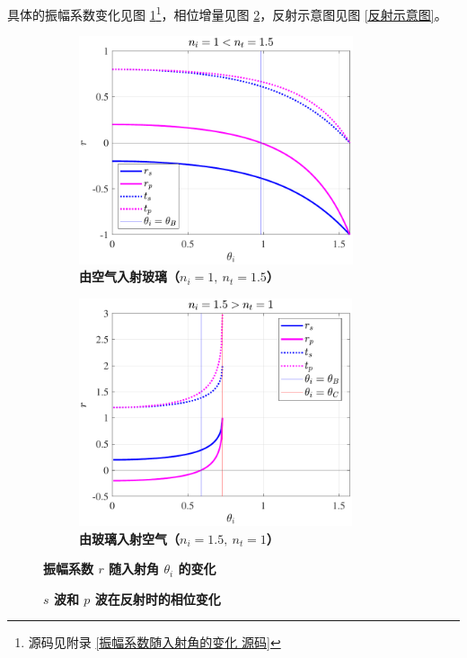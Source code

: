 \documentclass[UTF8]{report}
\theoremstyle{MyLineTheoremStyle} %
\theoremstyle{MyBlockTheoremStyle} %
\theoremstyle{MySubsubsectionStyle} %
\begin{document}
具体的振幅系数变化见图 \ref{振幅系数随入射角的变化}\footnote{源码见附录 \ref{振幅系数随入射角的变化 源码}}，相位增量见图 \ref{反射时 s 波和 p 波的相位变化}，反射示意图见图 \ref{反射示意图}。

\begin{figure}[H]\centering
\begin{subfigure}[t]{0.49\textwidth}\centering
    \includegraphics[height=190pt]{assets/1,2/2024-09-15_10-53-31.pdf}
    \caption{\bfseries 由空气入射玻璃（$n_i = 1,\ n_t = 1.5$） }
\end{subfigure}
\begin{subfigure}[t]{0.49\textwidth}\centering
    \includegraphics[height=190pt]{assets/1,2/2024-09-15_10-53-27.pdf}
    \caption{\bfseries 由玻璃入射空气（$n_i = 1.5,\ n_t = 1$） }
\end{subfigure}
\caption{\bfseries 振幅系数 $r$ 随入射角 $\theta_i$ 的变化 }\label{振幅系数随入射角的变化}
\end{figure}

\begin{figure}[ht]\centering
    
    \caption{\bfseries $s$ 波和 $p$ 波在反射时的相位变化}\label{反射时 s 波和 p 波的相位变化}
\end{figure}
\end{document}
